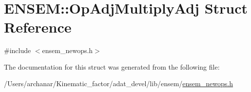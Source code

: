 \hypertarget{structENSEM_1_1OpAdjMultiplyAdj}{}\section{E\+N\+S\+EM\+:\+:Op\+Adj\+Multiply\+Adj Struct Reference}
\label{structENSEM_1_1OpAdjMultiplyAdj}


{\ttfamily \#include $<$ensem\+\_\+newops.\+h$>$}



The documentation for this struct was generated from the following file\+:\begin{DoxyCompactItemize}
\item 
/\+Users/archanar/\+Kinematic\+\_\+factor/adat\+\_\+devel/lib/ensem/\mbox{\hyperlink{lib_2ensem_2ensem__newops_8h}{ensem\+\_\+newops.\+h}}\end{DoxyCompactItemize}
